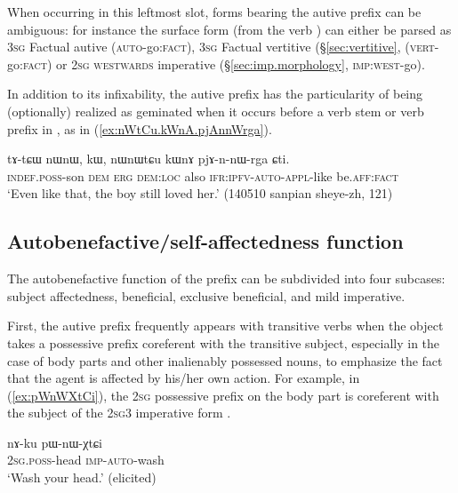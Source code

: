When occurring in this leftmost slot, forms bearing the autive prefix can be ambiguous: for instance the surface form  (from the verb ) can either be parsed as \textsc{3sg} Factual autive  (\textsc{auto}-go:\textsc{fact}), \textsc{3sg} Factual vertitive (§\ref{sec:vertitive}, (\textsc{vert}-go:\textsc{fact}) or \textsc{2sg} \textsc{westwards} imperative (§\ref{sec:imp.morphology}, \textsc{imp}:\textsc{west}-go).

In addition to its infixability, the autive prefix has the particularity of being (optionally) realized as geminated  when it occurs before a verb stem or verb prefix in , as in (\ref{ex:nWtCu.kWnA.pjAnnWrga}).

\begin{exe}
\ex \label{ex:nWtCu.kWnA.pjAnnWrga}
\gll  tɤ-tɕɯ nɯnɯ, kɯ, nɯnɯtɕu kɯnɤ pjɤ-n-nɯ-rga ɕti. \\
\textsc{indef}.\textsc{poss}-son \textsc{dem} \textsc{erg} \textsc{dem}:\textsc{loc} also \textsc{ifr}:\textsc{ipfv}-\textsc{auto}-\textsc{appl}-like be.\textsc{aff}:\textsc{fact} \\
\glt `Even like that, the boy still loved her.' (140510 sanpian sheye-zh, 121)
\end{exe}

\subsection{Autobenefactive/self-affectedness function}  \label{sec:autoben.proper}
The autobenefactive function of the  prefix can be subdivided into four subcases: subject affectedness, beneficial, exclusive beneficial, and mild imperative.

First, the autive prefix frequently appears with transitive verbs when the object takes a possessive prefix coreferent with the transitive subject, especially in the case of body parts and other inalienably possessed nouns, to emphasize the fact that the agent is affected by his/her own action. For example, in (\ref{ex:pWnWXtCi}), the \textsc{2sg} possessive prefix on the body part  is coreferent with the subject of the 2\textsc{sg}\fl{}3 imperative form .

\begin{exe}
\ex \label{ex:pWnWXtCi}
\gll  nɤ-ku pɯ-nɯ-χtɕi  \\
\textsc{2sg}.\textsc{poss}-head \textsc{imp}-\textsc{auto}-wash \\
\glt `Wash your head.' (elicited)
\end{exe}

